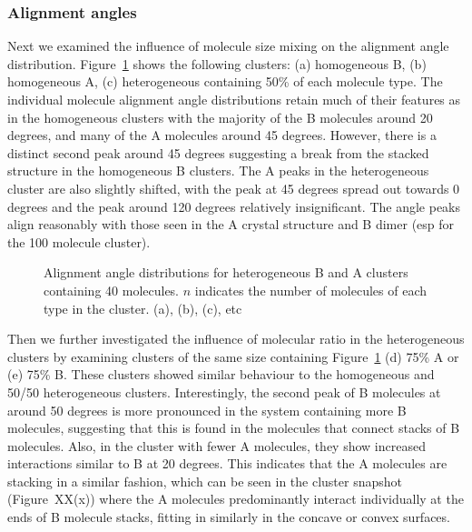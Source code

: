 \subsubsection{Alignment angles}

Next we examined the influence of molecule size mixing on the alignment angle distribution.  Figure~\ref{fig:alignmentangles_hetero} shows the following clusters: (a) homogeneous B, (b) homogeneous A, (c) heterogeneous containing 50\% of each molecule type. The individual molecule alignment angle distributions retain much of their features as in the homogeneous clusters with the majority of the B molecules around 20 degrees, and many of the A molecules around 45 degrees.  However, there is a distinct second peak around 45 degrees suggesting a break from the stacked structure in the homogeneous B clusters.  The A peaks in the heterogeneous cluster are also slightly shifted, with the peak at 45 degrees spread out towards 0 degrees and the peak around 120 degrees relatively insignificant.
The angle peaks align reasonably with those seen in the A crystal structure and B dimer (esp for the 100 molecule cluster).
%
\begin{figure}[!tbh]
\centering
\caption{Alignment angle distributions for heterogeneous B and A clusters containing 40 molecules. $n$ indicates the number of molecules of each type in the cluster. (a), (b), (c), etc}
\label{fig:alignmentangles_hetero}
\end{figure}
%

Then we further investigated the influence of molecular ratio in the heterogeneous clusters by examining clusters of the same size containing Figure~\ref{fig:alignmentangles_hetero} (d) 75\% A or (e) 75\% B.  These clusters showed similar behaviour to the homogeneous and 50/50 heterogeneous clusters.  Interestingly, the second peak of B molecules at around 50 degrees is more pronounced in the system containing more B molecules, suggesting that this is found in the molecules that connect stacks of B molecules.  Also, in the cluster with fewer A molecules, they show increased interactions similar to B at 20 degrees.  This indicates that the A molecules are stacking in a similar fashion, which can be seen in the cluster snapshot (Figure~XX(x)) where the A molecules predominantly interact individually at the ends of B molecule stacks, fitting in similarly in the concave or convex surfaces.

